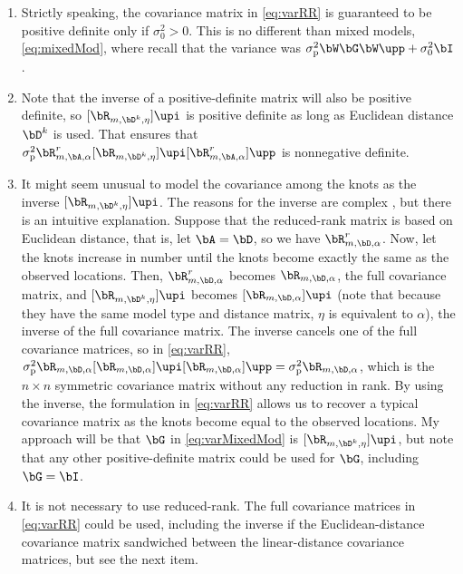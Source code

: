 \begin{enumerate}
		\item Strictly speaking, the covariance matrix in \ref{eq:varRR} is guaranteed to be positive definite only if $\sigma_0^2 > 0$. This is no different than mixed models, \ref{eq:mixedMod}, where recall that the variance was $\sigma^2_\textrm{p}\bW\bG\bW\upp + \sigma_0^2\bI$.  
		\item Note that the inverse of a positive-definite matrix will also be positive definite, so $[\bR_{m,\bD^k,\eta}]\upi$ is positive definite as long as Euclidean distance $\bD^k$ is used.  That ensures that $\sigma^2_\textrm{p}\bR^r_{m,\bA,\alpha}[\bR_{m,\bD^k,\eta}]\upi[\bR^r_{m,\bA,\alpha}]\upp$ is nonnegative definite.
		\item It might seem unusual to model the covariance among the knots as the inverse $[\bR_{m,\bD^k,\eta}]\upi$. The reasons for the inverse are complex \citep{Bane:Gelf:Finl:Sang:gaus:2008},  but there is an intuitive explanation.  Suppose that the reduced-rank matrix is based on Euclidean distance, that is, let $\bA = \bD$, so we have $\bR^r_{m,\bD,\alpha}$. Now, let the knots increase in number until the knots become exactly the same as the observed locations. Then, $\bR^r_{m,\bD,\alpha}$ becomes $\bR_{m,\bD,\alpha}$, the full covariance matrix, and $[\bR_{m,\bD^k,\eta}]\upi$ becomes $[\bR_{m,\bD,\alpha}]\upi$ (note that because they have the same model type and distance matrix, $\eta$ is equivalent to $\alpha$), the inverse of the full covariance matrix. The inverse cancels one of the full covariance matrices, so in \ref{eq:varRR}, $\sigma^2_\textrm{p}\bR_{m,\bD,\alpha}[\bR_{m,\bD,\alpha}]\upi[\bR_{m,\bD,\alpha}]\upp = \sigma^2_\textrm{p}\bR_{m,\bD,\alpha}$, which is the $n \times n$ symmetric covariance matrix without any reduction in rank.  By using the inverse, the formulation in \ref{eq:varRR} allows us to recover a typical covariance matrix as the knots become equal to the observed locations.  My approach will be that $\bG$ in \ref{eq:varMixedMod} is $[\bR_{m,\bD^k,\eta}]\upi$, but note that any other positive-definite matrix could be used for $\bG$, including $\bG = \bI$.
		\item It is not necessary to use reduced-rank.  The full covariance matrices in \ref{eq:varRR} could be used, including the inverse if the Euclidean-distance covariance matrix sandwiched between the linear-distance covariance matrices, but see the next item.

\end{enumerate}
